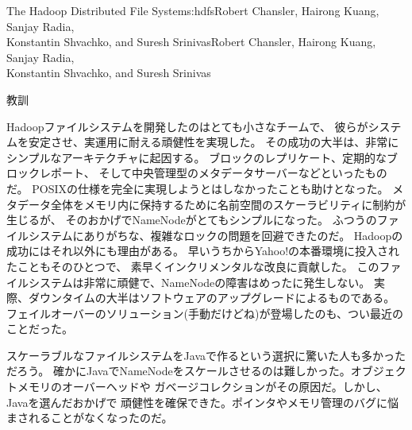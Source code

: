 \begin{aosachaptertoc}{The Hadoop Distributed File System}{s:hdfs}{Robert Chansler, Hairong Kuang, Sanjay Radia, \\ Konstantin Shvachko, and Suresh Srinivas}{Robert Chansler, Hairong Kuang, Sanjay Radia, \\ \hspace*{0.9cm} Konstantin Shvachko, and Suresh Srinivas}
\begin{aosasect1}{教訓}

Hadoopファイルシステムを開発したのはとても小さなチームで、
彼らがシステムを安定させ、実運用に耐える頑健性を実現した。
その成功の大半は、非常にシンプルなアーキテクチャに起因する。
ブロックのレプリケート、定期的なブロックレポート、
そして中央管理型のメタデータサーバーなどといったものだ。
POSIXの仕様を完全に実現しようとはしなかったことも助けとなった。
メタデータ全体をメモリ内に保持するために名前空間のスケーラビリティに制約が生じるが、
そのおかげでNameNodeがとてもシンプルになった。
ふつうのファイルシステムにありがちな、複雑なロックの問題を回避できたのだ。
Hadoopの成功にはそれ以外にも理由がある。
早いうちからYahoo!の本番環境に投入されたこともそのひとつで、
素早くインクリメンタルな改良に貢献した。
このファイルシステムは非常に頑健で、NameNodeの障害はめったに発生しない。
実際、ダウンタイムの大半はソフトウェアのアップグレードによるものである。
フェイルオーバーのソリューション(手動だけどね)が登場したのも、つい最近のことだった。

スケーラブルなファイルシステムをJavaで作るという選択に驚いた人も多かっただろう。
確かにJavaでNameNodeをスケールさせるのは難しかった。オブジェクトメモリのオーバーヘッドや
ガベージコレクションがその原因だ。しかし、Javaを選んだおかげで
頑健性を確保できた。ポインタやメモリ管理のバグに悩まされることがなくなったのだ。


\end{aosasect1}
\end{aosachaptertoc}
